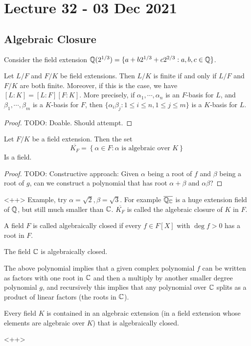 \section{Lecture 32 - 03 Dec 2021}
\subsection{Algebraic Closure}
\begin{example}
  Consider the field extension $\mathbb Q(2^{1/3})=\{a+b2^{1/3} + c2^{2/3} : a,b,c\in\mathbb Q\}$.
\end{example}
\begin{theorem}
  Let $L/F$ and $F/K$ be field extensions. Then $L/K$ is finite if and only if $L/F$ and
  $F/K$ are both finite. Moreover, if this is the case, we have $[L:K]=[L:F][F:K]$. More
  precisely, if $\alpha_1,\cdots, \alpha_n$ is an $F$-basis for $L$, and $\beta_1,\cdots,
  \beta_m$ is a $K$-basis for $F$, then $\{\alpha_i\beta_j : 1\leq i\leq n, 1\leq j\leq
  m\}$ is a $K$-basis for $L$.
\end{theorem}
\begin{proof}
  TODO: Doable. Should attempt.
\end{proof}

\begin{theorem}
  Let $F/K$ be a field extension. Then the set
  \[\overline{K_F} = \left\{ \alpha\in F : \alpha\text{ is algebraic over } K\right\}\]
  Is a field.
  \label{<+label+>}
\end{theorem}
\begin{proof}
  TODO: Constructive approach: Given $\alpha$ being a root of $f$ and $\beta$ being a root
  of $g$, can we construct a polynomial that has root $\alpha+\beta$ and $\alpha\beta$?
\end{proof}<++>
Example, try $\alpha=\sqrt{2}, \beta=\sqrt{3}$. For example $\overline{\mathbb Q_{\mathbb C}}$ is a
huge extension field of $\mathbb Q$, but still much smaller than $\mathbb C$.
$\overline{K_F}$ is called the algebraic closure of $K$ in $F$.
\begin{definition}
  A field $F$ is called algebraically closed if every $f\in F[X]$ with $\deg f>0$ has a
  root in $F$.
  \label{<+label+>}
\end{definition}

\begin{theorem}
  The field $\mathbb C$ is algebraically closed.
  \label{thm:FTAlg}
\end{theorem}
The above polynomial implies that a given complex polynomial $f$ can be written as factors
with one root in $\mathbb C$ and then a multiply by another smaller degree polynomial $g$, and
recursively this implies that any polynomial over $\mathbb C$ splits as a product of linear
factors (the roots in $\mathbb C$).
\begin{theorem}
  Every field $K$ is contained in an algebraic extension (in a field extension whose
  elements are algebraic over $K$) that is algebraically closed.
  \label{<+label+>}
\end{theorem}<++>
